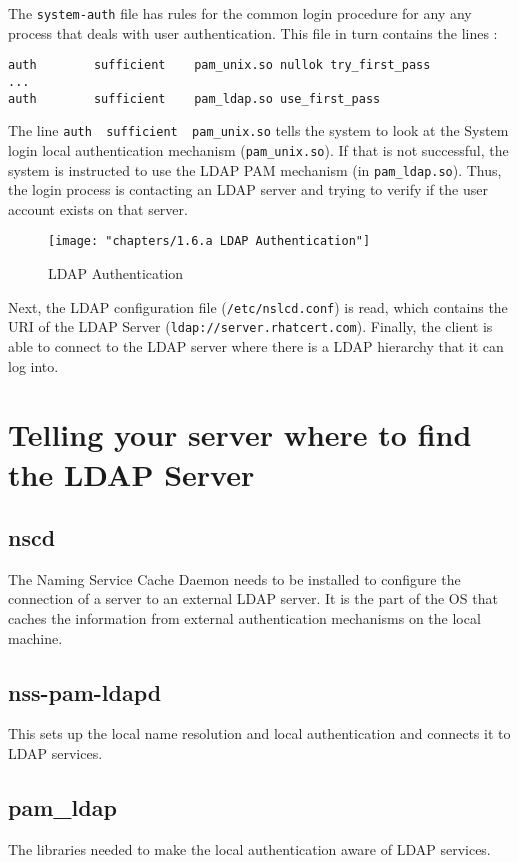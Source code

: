 The \verb|system-auth| file has rules for the common login procedure for any any process that deals with user authentication. This file in turn contains the lines :

\begin{verbatim}
auth        sufficient    pam_unix.so nullok try_first_pass
...
auth        sufficient    pam_ldap.so use_first_pass
\end{verbatim}

The line \verb|auth  sufficient  pam_unix.so| tells the system to look at the System login local authentication mechanism (\verb|pam_unix.so|). If that is not successful, the system is instructed to use the LDAP PAM mechanism (in \verb|pam_ldap.so|). Thus, the login process is contacting an LDAP server and trying to verify if the user account exists on that server. 

\begin{figure}[H]
	\centering
	\texttt{[image: "chapters/1.6.a LDAP Authentication"]}
	\caption{LDAP Authentication}
	\label{fig:1}
\end{figure}

\noindent
Next, the LDAP configuration file (\verb|/etc/nslcd.conf|) is read, which contains the URI of the LDAP Server (\verb|ldap://server.rhatcert.com|). Finally, the client is able to connect to the LDAP server where there is a LDAP hierarchy that it can log into.  

\section{Telling your server where to find the LDAP Server}

\subsection{nscd}
The Naming Service Cache Daemon needs to be installed to configure the connection of a server to an external LDAP server. It is the part of the OS that caches the information from external authentication mechanisms on the local machine.

\subsection{nss-pam-ldapd}
This sets up the local name resolution and local authentication and connects it to LDAP services. 

\subsection{pam\_ldap}
The libraries needed to make the local authentication aware of LDAP services. 

